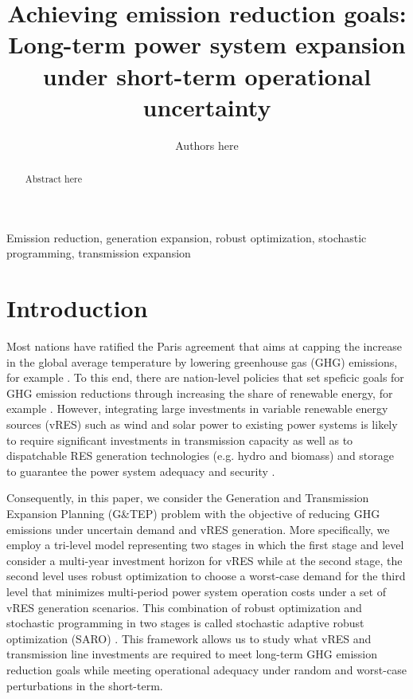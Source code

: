 \documentclass[final]{IEEEtran}
\begin{document}
\title{Achieving emission reduction goals: Long-term power system expansion under short-term operational uncertainty}
\author{Authors here}
\maketitle

\begin{abstract}
Abstract here
\end{abstract}
\begin{IEEEkeywords}
Emission reduction, generation expansion, robust optimization, stochastic programming, transmission expansion
\end{IEEEkeywords}

\section{Introduction}

Most nations have ratified the Paris agreement that aims at capping the increase in the global average temperature by lowering greenhouse gas (GHG) emissions, for example \cite{Paris_agreement}. To this end, there are nation-level policies that set speficic goals for GHG emission reductions through increasing the share of renewable energy, for example \cite{EU_climate_action}. However, integrating large investments in variable renewable energy sources (vRES) such as wind and solar power to existing power systems is likely to require significant investments in transmission capacity as well as to dispatchable RES generation technologies (e.g. hydro and biomass) and storage to guarantee the power system adequacy and security \cite{Zappa}.

Consequently, in this paper, we consider the Generation and Transmission Expansion Planning (G\&TEP) problem with the objective of reducing GHG emissions under uncertain demand and vRES generation. More specifically, we employ a tri-level model representing two stages in which the first stage and level consider a multi-year investment horizon for vRES while at the second stage, the second level uses robust optimization to choose a worst-case demand for the third level that minimizes multi-period power system operation costs under a set of vRES generation scenarios. This combination of robust optimization and stochastic programming in two stages is called stochastic adaptive robust optimization (SARO) \cite{Baringo2018}. This framework allows us to study what vRES and transmission line investments are required to meet long-term GHG emission reduction goals while meeting operational adequacy under random and worst-case perturbations in the short-term.
\end{document}
